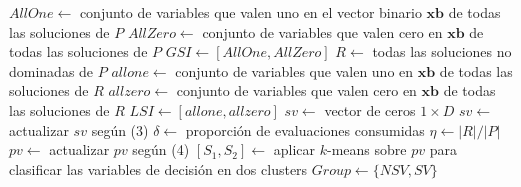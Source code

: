 \begin{algorithm}[H]
\caption{AnálisisDeEsparsidad$(P, pv)$}
$AllOne \leftarrow$ conjunto de variables que valen uno en el vector binario $\mathbf{xb}$ de todas las soluciones de $P$\;
$AllZero \leftarrow$ conjunto de variables que valen cero en $\mathbf{xb}$ de todas las soluciones de $P$\;
$GSI \leftarrow [AllOne, AllZero]$\;
$R \leftarrow$ todas las soluciones no dominadas de $P$\;
$allone \leftarrow$ conjunto de variables que valen uno en $\mathbf{xb}$ de todas las soluciones de $R$\;
$allzero \leftarrow$ conjunto de variables que valen cero en $\mathbf{xb}$ de todas las soluciones de $R$\;
$LSI \leftarrow [allone, allzero]$\;
$sv \leftarrow$ vector de ceros $1\times D$\;
$sv \leftarrow$ actualizar $sv$ según (3)\;
$\delta \leftarrow$ proporción de evaluaciones consumidas\;
$\eta \leftarrow |R|/|P|$\;
$pv \leftarrow$ actualizar $pv$ según (4)\;
$[S_1, S_2] \leftarrow$ aplicar $k$-means sobre $pv$ para clasificar las variables de decisión en dos clusters\;
$Group \leftarrow \{NSV, SV\}$\;
\end{algorithm}
 
